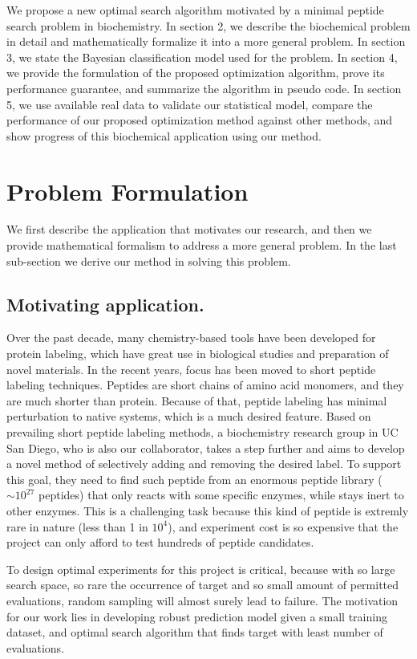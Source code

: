 \documentclass[opre,nonblindrev]{informs3} %
\begin{document}
We propose a new optimal search algorithm motivated by a minimal peptide search problem in biochemistry. In section 2, we describe the biochemical problem in detail and mathematically formalize it into a more general problem. In section 3, we state the Bayesian classification model used for the problem. In section 4, we provide the formulation of the proposed optimization algorithm, prove its performance guarantee, and summarize the algorithm in pseudo code. In section 5, we use available real data to validate our statistical model, compare the performance of our proposed optimization method against
other methods, and show progress of this biochemical application using our method.

\section{Problem Formulation} \label{sec:problem}

We first describe the application that motivates our research, and then we provide mathematical formalism to address a more general problem. In the last sub-section we derive our method in solving this problem.

\subsection{Motivating application.} \label{sec: motivate app}
Over the past decade, many chemistry-based tools have been developed for protein labeling, which have great use in biological studies and preparation of novel materials. In the recent years, focus has been moved to short peptide labeling techniques. Peptides are short chains of amino acid monomers, and they are much shorter than protein. Because of that, peptide labeling has minimal perturbation to native systems, which is a much desired feature.  Based on prevailing short peptide
labeling methods, a biochemistry research group in UC San Diego, who is also our collaborator, takes a step further and aims to develop a novel method of selectively adding and removing the desired label. To support this goal, they need to find such peptide from an enormous peptide library ($\sim 10^{27}$ peptides) that only reacts with some specific enzymes, while stays inert to other enzymes. This is a challenging task because this kind of peptide is extremly rare in nature (less than 1 in $10^4$), and experiment cost
is so expensive that the project can only afford to test hundreds of peptide candidates.

To design optimal experiments for this project is critical, because with so large search space, so rare the occurrence of target and so small amount of permitted evaluations, random sampling will almost surely lead to failure. The motivation for our work lies in developing robust prediction model given a small training dataset, and optimal search algorithm that finds target with least number of evaluations.
\end{document}
